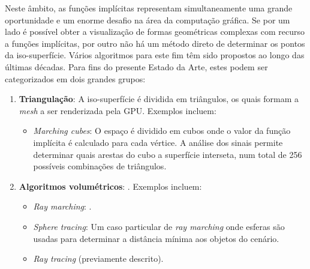 
Neste âmbito, as funções implícitas representam simultaneamente uma grande oportunidade e um enorme desafio na área da computação gráfica. Se por um lado é possível obter a visualização de formas geométricas complexas com recurso a funções implícitas, por outro não há um método direto de determinar os pontos da iso-superfície. Vários algoritmos para este fim têm sido propostos ao longo das últimas décadas. Para fins do presente Estado da Arte, estes podem ser categorizados em dois grandes grupos:

\begin{enumerate}
	\item \textbf{Triangulação}: A iso-superfície é dividida em triângulos, os quais formam a \textit{mesh} a ser renderizada pela \ac{GPU}. Exemplos incluem:
	\begin{itemize}[nosep]
		\item \textit{Marching cubes}\cite{Lorensen1987}: O espaço é dividido em cubos onde o valor da função implícita é calculado para cada vértice. A análise dos sinais permite determinar quais arestas do cubo a superfície interseta, num total de 256 possíveis combinações de triângulos.
	\end{itemize}
	
	\item \textbf{Algoritmos volumétricos}: . Exemplos incluem:
	\begin{itemize}
		\item \textit{Ray marching}: .
		\item \textit{Sphere tracing}\cite{Hart1996}: Um caso particular de \textit{ray marching} onde esferas são usadas para determinar a distância mínima aos objetos do cenário.
		\item \textit{Ray tracing} (previamente descrito).
	\end{itemize}
\end{enumerate}


